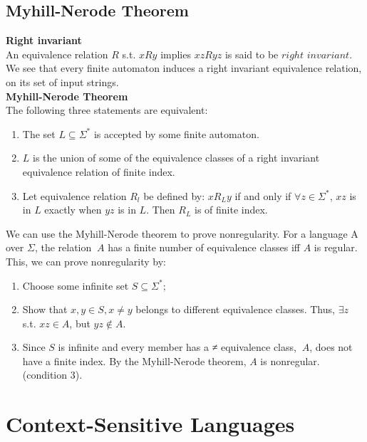 \documentclass[a4paper]{article}
\begin{document}
\subsection{Myhill-Nerode Theorem} %
\label{sub:Myhill-Nerode Theorem}
{\bf Right invariant} \\
An equivalence relation $R$ s.t. $xRy$ implies $xzRyz$ is said to be $right$ $invariant$. We see that every finite automaton induces a right invariant equivalence relation, on its set of input strings. \\
{\bf Myhill-Nerode Theorem} \\
The following three statements are equivalent:
\begin{enumerate}
  \item The set $L \subseteq \Sigma^*$ is accepted by some finite automaton.
  \item $L$ is the union of some of the equivalence classes of a right invariant equivalence relation of finite index.
  \item Let equivalence relation $R_l$ be defined by: $xR_Ly$ if and only if $\forall z \in \Sigma^*$, $xz$ is in 
    $L$ exactly when $yz$ is in $L$. Then $R_L$ is of finite index.
\end{enumerate}
We can use the Myhill-Nerode theorem to prove nonregularity. For a language A over $\Sigma$, the relation $~A$ has a finite number of equivalence classes iff $A$ is regular. This, we can prove nonregularity by:
\begin{enumerate}
  \item Choose some infinite set $S \subseteq \Sigma^*$;
  \item Show that $x,y \in S, x \neq y$ belongs to different equivalence classes. Thus, $\exists z$ s.t. $ xz \in A$, but 
    $yz \notin A$.
  \item Since $S$ is infinite and every member has a ≠ equivalence class, $~A$, does not have a finite index. By the Myhill-Nerode theorem, $A$ is nonregular. (condition 3).
\end{enumerate}
\section{Context-Sensitive Languages} %
\label{sec:Context-Free Languages}
\end{document}
